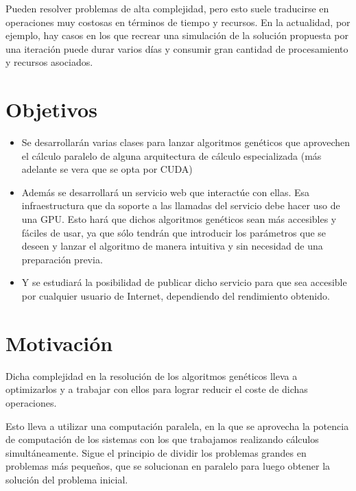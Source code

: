 \bigskip
Pueden resolver problemas de alta complejidad, pero esto suele traducirse en operaciones muy costosas en términos de tiempo y recursos. En la actualidad, por ejemplo, hay casos en los que recrear una simulación de la solución propuesta por una iteración puede durar varios días y consumir gran cantidad de procesamiento y recursos asociados.





\bigskip
\section{Objetivos}
\bigskip


\begin{itemize}
	
	\item Se desarrollarán varias clases para lanzar algoritmos genéticos que aprovechen el cálculo paralelo de alguna arquitectura de cálculo especializada (más adelante se vera que se opta por CUDA)
	
	\item Además se desarrollará un servicio web que interactúe con ellas. Esa infraestructura que da soporte a las llamadas del servicio debe hacer uso de una GPU. Esto hará que dichos algoritmos genéticos sean más accesibles y fáciles de usar, ya que sólo tendrán que introducir los parámetros que se deseen y lanzar el algoritmo de manera intuitiva y sin necesidad de una preparación previa.
	
	\item Y se estudiará la posibilidad de publicar dicho servicio para que sea accesible por cualquier usuario de Internet, dependiendo del rendimiento obtenido.
	
\end{itemize}



\bigskip
\section{Motivación}
\bigskip

Dicha complejidad en la resolución de los algoritmos genéticos lleva a optimizarlos y a trabajar con ellos para lograr reducir el coste de dichas operaciones. 

Esto lleva a utilizar una computación paralela, en la que se aprovecha la potencia de computación de los sistemas con los que trabajamos realizando cálculos simultáneamente. Sigue el principio de dividir los problemas grandes en problemas más pequeños, que se solucionan en paralelo para luego obtener la solución del problema inicial.

